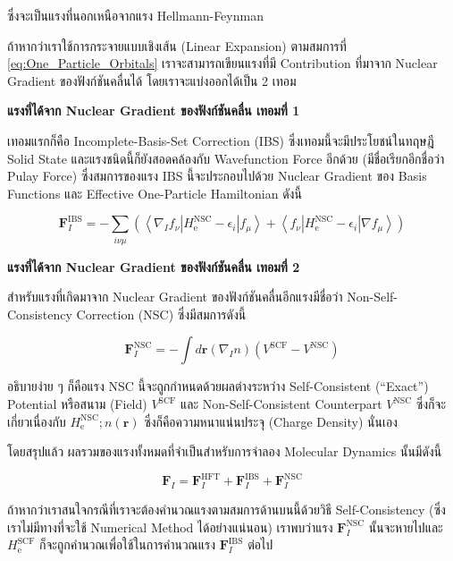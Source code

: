 \noindent ซึ่งจะเป็นแรงที่นอกเหนือจากแรง Hellmann-Feynman

ถ้าหากว่าเราใช้การกระจายแบบเชิงเส้น (Linear Expansion) ตามสมการที่ \eqref{eq:One_Particle_Orbitals} เราจะสามารถเขียนแรงที่มี
Contribution ที่มาจาก Nuclear Gradient ของฟังก์ชันคลื่นได้ โดยเราจะแบ่งออกได้เป็น 2 เทอม

\noindent \textbf{แรงที่ได้จาก Nuclear Gradient ของฟังก์ชันคลื่น เทอมที่ 1}

เทอมแรกก็คือ Incomplete-Basis-Set Correction (IBS) ซึ่งเทอมนี้จะมีประโยชน์ในทฤษฎี Solid State และแรงชนิดนี้ก็ยังสอดคล้องกับ
Wavefunction Force อีกด้วย (มีชื่อเรียกอีกชื่อว่า Pulay Force) ซึ่งสมการของแรง IBS นี้จะประกอบไปด้วย Nuclear Gradient ของ
Basis Functions และ Effective One-Particle Hamiltonian ดังนี้

\begin{equation}
  \mathbf{F}_I^{\mathrm{IBS}}
  =
  - \sum_{i \nu \mu}\left(\left\langle\nabla_I f_\nu\left| H_{\mathrm{e}}^{\mathrm{NSC}}-\epsilon_i\right| f_\mu\right\rangle
  + \left\langle f_\nu\left| H_{\mathrm{e}}^{\mathrm{NSC}}-\epsilon_i\right| \nabla f_\mu\right\rangle\right)
\end{equation}

\noindent \textbf{แรงที่ได้จาก Nuclear Gradient ของฟังก์ชันคลื่น เทอมที่ 2}

สำหรับแรงที่เกิดมาจาก Nuclear Gradient ของฟังก์ชันคลื่นอีกแรงมีชื่อว่า Non-Self-Consistency Correction (NSC) ซึ่งมีสมการดังนี้

\begin{equation}
  \mathbf{F}_I^{\mathrm{NSC}}
  =
  - \int d \mathbf{r}\left(\nabla_I n\right)\left(V^{\mathrm{SCF}}-V^{\mathrm{NSC}}\right)
\end{equation}

\noindent อธิบายง่าย ๆ ก็คือแรง NSC นี้จะถูกกำหนดด้วยผลต่างระหว่าง Self-Consistent (\enquote{Exact}) Potential หรือสนาม
(Field) $V^{\mathrm{SCF}}$ และ Non-Self-Consistent Counterpart $V^{\mathrm{NSC}}$ ซึ่งก็จะเกี่ยวเนื่องกับ
$H_{\mathrm{e}}^{\mathrm{NSC}} ; n(\mathbf{r})$ ซึ่งก็คือความหนาแน่นประจุ (Charge Density) นั่นเอง

โดยสรุปแล้ว ผลรวมของแรงทั้งหมดที่จำเป็นสำหรับการจำลอง  Molecular Dynamics นั้นมีดังนี้

\begin{equation}
  \mathbf{F}_I
  =
  \mathbf{F}_I^{\mathrm{HFT}}
  + \mathbf{F}_I^{\mathrm{IBS}}
  + \mathbf{F}_I^{\mathrm{NSC}}
\end{equation}

\noindent ถ้าหากว่าเราสนใจกรณีที่เราจะต้องคำนวณแรงตามสมการด้านบนนี้ด้วยวิธี Self-Consistency (ซึ่งเราไม่มีทางที่จะใช้ Numerical
Method ได้อย่างแน่นอน) เราพบว่าแรง $\mathbf{F}_I^{\mathrm{NSC}}$ นั้นจะหายไปและ $ H_{\mathrm{e}}^{\mathrm{SCF}}$
ก็จะถูกคำนวณเพื่อใช้ในการคำนวณแรง $\mathbf{F}_I^{\mathrm{IBS}}$ ต่อไป

